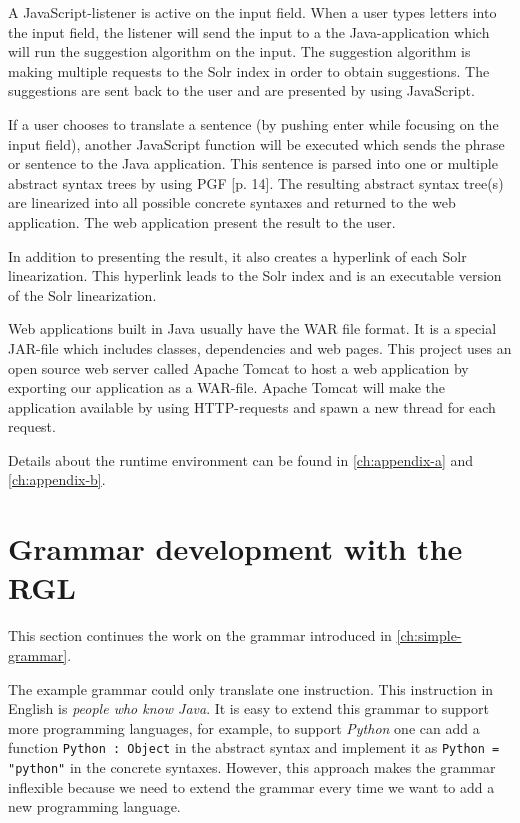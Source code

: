 A JavaScript-listener is active on the input field. When a user types letters into the input field, the listener will send the input to a the Java-application which will run the suggestion algorithm on the input. The suggestion algorithm is making multiple requests to the Solr index in order to obtain suggestions. The suggestions are sent back to the user and are presented by using JavaScript.

If a user chooses to translate a sentence (by pushing enter while focusing on the input field), another JavaScript function will be executed which sends the phrase or sentence to the Java application. This sentence is parsed into one or multiple abstract syntax trees by using PGF \cite{angelov:2011}[p. 14]. The resulting abstract syntax tree(s) are linearized into all possible concrete syntaxes and returned to the web application. The web application present the result to the user. 

In addition to presenting the result, it also creates a hyperlink of each Solr linearization. This hyperlink leads to the Solr index and is an executable version of the Solr linearization.

Web applications built in Java usually have the WAR file format. It is a special JAR-file which includes classes, dependencies and web pages. This project uses an open source web server called Apache Tomcat \cite{tomcat} to host a web application by exporting our application as a WAR-file. Apache Tomcat will make the application available by using HTTP-requests and spawn a new thread for each request.

Details about the runtime environment can be found in \autoref{ch:appendix-a} and \autoref{ch:appendix-b}.

\section{Grammar development with the RGL}
This section continues the work on the grammar introduced in \autoref{ch:simple-grammar}.

The example grammar could only translate one instruction. This instruction in English is \emph{people who know Java}. It is easy to extend this grammar to support more programming languages, for example, to support \emph{Python} one can add a function \texttt{Python : Object} in the abstract syntax and implement it as \texttt{Python = "python"} in the concrete syntaxes. However, this approach makes the grammar inflexible because we need to extend the grammar every time we want to add a new programming language.

